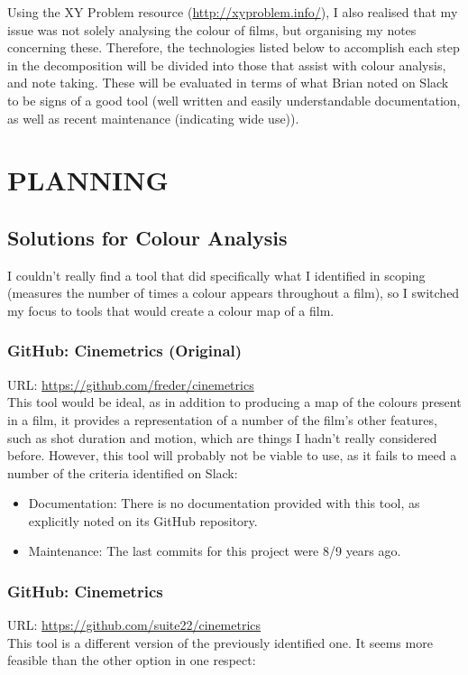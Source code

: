 \documentclass{article}
\begin{document}
Using the XY Problem resource (\url{http://xyproblem.info/}), I also realised that my issue was not solely analysing the colour of films, but organising my notes concerning these. Therefore, the technologies listed below to accomplish each step in the decomposition will be divided into those that assist with colour analysis, and note taking. These will be evaluated in terms of what Brian noted on Slack to be signs of a good tool (well written and easily understandable documentation, as well as recent maintenance (indicating wide use)).

\section{PLANNING}

\subsection{Solutions for Colour Analysis}
I couldn't really find a tool that did specifically what I identified in scoping (measures the number of times a colour appears throughout a film), so I switched my focus to tools that would create a colour map of a film.

\subsubsection{GitHub: Cinemetrics (Original)}
URL: \url{https://github.com/freder/cinemetrics}\\
This tool would be ideal, as in addition to producing a map of the colours present in a film, it provides a representation of a number of the film's other features, such as shot duration and motion, which are things I hadn't really considered before. However, this tool will probably not be viable to use, as it fails to meed a number of the criteria identified on Slack: 
\begin{itemize}
    \item Documentation: There is no documentation provided with this tool, as explicitly noted on its GitHub repository.
    \item Maintenance: The last commits for this project were 8/9 years ago.
\end{itemize}

\subsubsection{GitHub: Cinemetrics}
URL: \url{https://github.com/suite22/cinemetrics}\\
This tool is a different version of the previously identified one. It seems more feasible than the other option in one respect:
\end{document}
